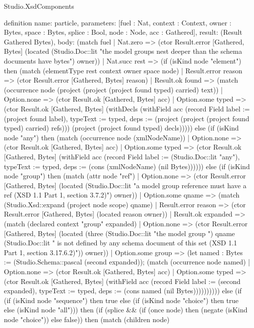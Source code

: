 \begin{lexlean}{Studio.XsdComponents}
\begin{semanticmodule}
definition{
  name: particle,
  parameters: [fuel : Nat, context : Context, owner : Bytes, space : Bytes, splice : Bool, node : Node, acc : Gathered],
  result: (Result Gathered Bytes),
  body: (match fuel
    | Nat.zero => (ctor Result.error [Gathered, Bytes] (located (Studio.Doc::lit "the model groups nest deeper than the schema documents have bytes") owner))
    | Nat.succ rest => (if (isKind node "element") then (match (elementType rest context owner space node)
      | Result.error reason => (ctor Result.error [Gathered, Bytes] reason)
      | Result.ok found => (match (occurrence node (project (project (project found typed) carried) text))
        | Option.none => (ctor Result.ok [Gathered, Bytes] acc)
        | Option.some typed => (ctor Result.ok [Gathered, Bytes] (withDecls (withField acc (record Field {label := (project found label), typeText := typed, deps := (project (project (project found typed) carried) refs)})) (project (project found typed) decls))))) else (if (isKind node "any") then (match (occurrence node (xmlNodeName))
      | Option.none => (ctor Result.ok [Gathered, Bytes] acc)
      | Option.some typed => (ctor Result.ok [Gathered, Bytes] (withField acc (record Field {label := (Studio.Doc::lit "any"), typeText := typed, deps := (cons (xmlNodeName) (nil Bytes))})))) else (if (isKind node "group") then (match (attr node "ref")
      | Option.none => (ctor Result.error [Gathered, Bytes] (located (Studio.Doc::lit "a model group reference must have a ref (XSD 1.1 Part 1, section 3.7.2)") owner))
      | Option.some qname => (match (Studio.Xsd::expand (project node scope) qname)
        | Result.error reason => (ctor Result.error [Gathered, Bytes] (located reason owner))
        | Result.ok expanded => (match (declared context "group" expanded)
          | Option.none => (ctor Result.error [Gathered, Bytes] (located (three (Studio.Doc::lit "the model group ") qname (Studio.Doc::lit " is not defined by any schema document of this set (XSD 1.1 Part 1, section 3.17.6.2)")) owner))
          | Option.some group => (let named : Bytes := (Studio.Schema::pascal (second expanded)); (match (occurrence node named)
            | Option.none => (ctor Result.ok [Gathered, Bytes] acc)
            | Option.some typed => (ctor Result.ok [Gathered, Bytes] (withField acc (record Field {label := (second expanded), typeText := typed, deps := (cons named (nil Bytes))})))))))) else (if (if (isKind node "sequence") then true else (if (isKind node "choice") then true else (isKind node "all"))) then (if (splice && (if (once node) then (negate (isKind node "choice")) else false)) then (match (children node)
}
\end{semanticmodule}
\end{lexlean}

